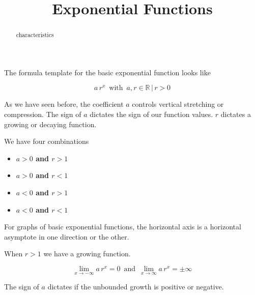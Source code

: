 \documentclass{ximera}
\title{Exponential Functions}
\begin{document}
\begin{abstract}
characteristics
\end{abstract}
\maketitle




The formula template for the basic exponential function looks like




\[  a \, r^x   \, \text{ with } \,  a, r \in \mathbb{R} \, | \,  r > 0   \]


As we have seen before, the coefficient $a$ controls vertical stretching or compression. The sign of $a$ dictates the sign of our function values. $r$ dictates a growing or decaying function.




We have four combinations

\begin{itemize}
\item \textbf{\textcolor{blue!55!black}{$a>0$ and $r>1$}}
\item \textbf{\textcolor{blue!55!black}{$a>0$ and $r<1$}}
\item \textbf{\textcolor{blue!55!black}{$a<0$ and $r>1$}}
\item \textbf{\textcolor{blue!55!black}{$a<0$ and $r<1$}}
\end{itemize}


For graphs of basic exponential functions, the horizontal axis is a horizontal asymptote in one direction or the other.


When $r > 1$ we have a growing function.

\[  \lim_{x \to -\infty} a \, r^x = 0 \, \text{ and } \, \lim_{x \to \infty} a \, r^x = \pm\infty \]


The sign of $a$ dictates if the unbounded growth is positive or negative.
\end{document}
